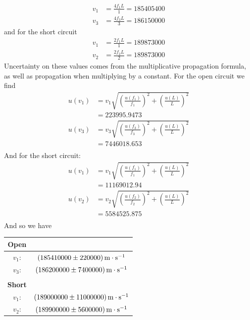 \documentclass[12pt]{article}
\numberwithin{equation}{section}
\numberwithin{figure}{section}
\begin{document}
    \begin{align*}
        v_1&=\frac{4f_1L}{1}=185405400\\
        v_3&=\frac{4f_3L}{3}=186150000
    \end{align*}
    and for the short circuit
    \begin{align*}
        v_1&=\frac{2f_1L}{1}=189873000\\
        v_2&=\frac{2f_2L}{2}=189873000
    \end{align*}
    Uncertainty on these values comes from the multiplicative propagation formula, as well as 
    propagation when multiplying by a constant. For the open circuit we find
    \begin{align*}
        u(v_1)&=v_1\sqrt{\left(\frac{u(f_1)}{f_1}\right)^2+\left(\frac{u(L)}{L}\right)^2}\\
        &=223995.9473\\
        u(v_3)&=v_3\sqrt{\left(\frac{u(f_3)}{f_3}\right)^2+\left(\frac{u(L)}{L}\right)^2}\\
        &=7446018.653\\
    \end{align*}
    And for the short circuit:
    \begin{align*}
        u(v_1)&=v_1\sqrt{\left(\frac{u(f_1)}{f_1}\right)^2+\left(\frac{u(L)}{L}\right)^2}\\
        &=11169012.94\\
        u(v_2)&=v_2\sqrt{\left(\frac{u(f_2)}{f_2}\right)^2+\left(\frac{u(L)}{L}\right)^2}\\
        &=5584525.875\\
    \end{align*}
    And so we have 
    \begin{table}[H]
        \centering
        \begin{tabular}{c c}
            \textbf{Open} & \\
            \hline
            $v_1$: & $\SI{185410000\pm220000}{\metre\cdot\second^{-1}}$\\
            $v_3$: & $\SI{186200000\pm7400000}{\metre\cdot\second^{-1}}$\\
            \hspace{3pt} & \\
            \textbf{Short} & \\
            \hline
            $v_1$: & $\SI{189000000\pm11000000}{\metre\cdot\second^{-1}}$\\
            $v_2$: & $\SI{189900000\pm5600000}{\metre\cdot\second^{-1}}$
        \end{tabular}
    \end{table}
    \noindent
\end{document}
